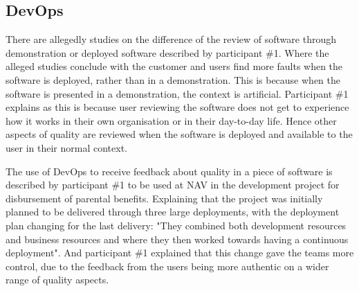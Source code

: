 


\subsection{DevOps} \label{sec:devops}
There are allegedly studies on the difference of the review of software through demonstration or deployed software described by participant \#1. Where the alleged studies conclude with the customer and users find more faults when the software is deployed, rather than in a demonstration. This is because when the software is presented in a demonstration, the context is artificial. Participant \#1 explains as this is because user reviewing the software does not get to experience how it works in their own organisation or in their day-to-day life. Hence other aspects of quality are reviewed when the software is deployed and available to the user in their normal context.


The use of DevOps to receive feedback about quality in a piece of software is described by participant \#1 to be used at NAV in the development project for disbursement of parental benefits. Explaining that the project was initially planned to be delivered through three large deployments, with the deployment plan changing for the last delivery: "They combined both development resources and business resources and where they then worked towards having a continuous deployment". And participant \#1 explained that this change gave the teams more control, due to the feedback from the users being more authentic on a wider range of quality aspects. 


